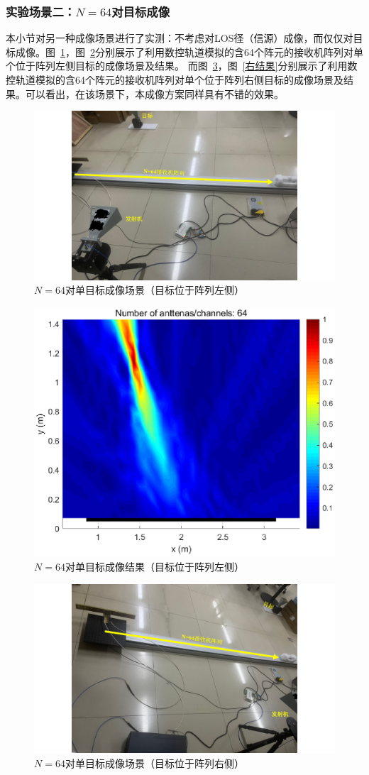 \subsubsection{实验场景二：$N=64$对目标成像}
本小节对另一种成像场景进行了实测：不考虑对LOS径（信源）成像，而仅仅对目标成像。图~\ref{左}，图~\ref{左结果}分别展示了利用数控轨道模拟的含64个阵元的接收机阵列对单个位于阵列左侧目标的成像场景及结果。
而图~\ref{右}，图~\ref{右结果}分别展示了利用数控轨道模拟的含64个阵元的接收机阵列对单个位于阵列右侧目标的成像场景及结果。可以看出，在该场景下，本成像方案同样具有不错的效果。
\begin{figure}[H]
  \centering
  \includegraphics[width=.8\textwidth]{figures/exp/left.pdf}
  \caption{$N=64$对单目标成像场景（目标位于阵列左侧）}
  \label{左}
\end{figure}
\begin{figure}[H]
  \centering
  \includegraphics[width=.8\textwidth]{figures/exp/N64_left.eps}
  \caption{$N=64$对单目标成像结果（目标位于阵列左侧）}
  \label{左结果}
\end{figure}
\begin{figure}[H]
  \centering
  \includegraphics[width=.8\textwidth]{figures/exp/right.pdf}
  \caption{$N=64$对单目标成像场景（目标位于阵列右侧）}
  \label{右}
\end{figure}
